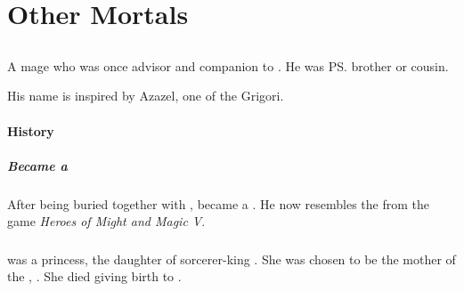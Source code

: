 \part{Other Mortals}
\chapter{\Nephilim}















\section{\Eshayzal}
\index{\Eshayzal}
A \nephil{} mage who was once advisor and companion to . 
He was \ps{\Semiza} brother or cousin. 

His name is inspired by Azazel, one of the Grigori. 








\subsection{History}
\subsubsection{Became a \Lich}
After being buried together with \Semiza, \Eshayzal{} became a \Lich. 
He now resembles the \Liches{} from the game \emph{Heroes of Might and Magic V}. 















\section{\Ilu}
\index{\Ilu}
\Ilu{} was a \nephil{} princess, the daughter of sorcerer-king . 
She was chosen to be the mother of the , . 
She died giving birth to \Thanatzil. 

